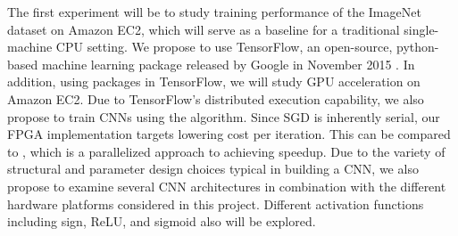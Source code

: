 The first experiment will be to study training performance of the ImageNet dataset on Amazon EC2, which will serve as a baseline for a traditional single-machine CPU setting.  We propose to use TensorFlow, an open-source, python-based machine learning package released by Google in November 2015 \cite{tensorflow}.  In addition, using packages in TensorFlow, we will study GPU acceleration on Amazon EC2.  Due to TensorFlow’s distributed execution capability, we also propose to train CNNs using the {} algorithm.  Since SGD is inherently serial, our FPGA implementation targets lowering cost per iteration.  This can be compared to {}, which is a parallelized approach to achieving speedup.  Due to the variety of structural and parameter design choices typical in building a CNN, we also propose to examine several CNN architectures in combination with the different hardware platforms considered in this project.  Different activation functions including sign, ReLU, and sigmoid also will be explored.
